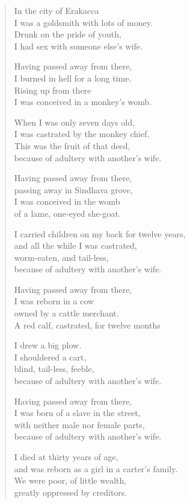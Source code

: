 \documentclass[12pt,openany]{book}%
\begin{document}
\begin{verse}
In the city of Erakacca \\
I was a goldsmith with lots of money. \\
Drunk on the pride of youth, \\
I had sex with someone else’s wife. 

Having passed away from there, \\
I burned in hell for a long time. \\
Rising up from there \\
I was conceived in a monkey’s womb. 

When I was only seven days old, \\
I was castrated by the monkey chief. \\
This was the fruit of that deed, \\
because of adultery with another’s wife. 

Having passed away from there, \\
passing away in Sindhava grove, \\
I was conceived in the womb \\
of a lame, one-eyed she-goat. 

I carried children on my back for twelve years, \\
and all the while I was castrated, \\
worm-eaten, and tail-less, \\
because of adultery with another’s wife. 

Having passed away from there, \\
I was reborn in a cow \\
owned by a cattle merchant. \\
A red calf, castrated, for twelve months 

I drew a big plow. \\
I shouldered a cart, \\
blind, tail-less, feeble, \\
because of adultery with another’s wife. 

Having passed away from there, \\
I was born of a slave in the street, \\
with neither male nor female parts, \\
because of adultery with another’s wife. 

I died at thirty years of age, \\
and was reborn as a girl in a carter’s family. \\
We were poor, of little wealth, \\
greatly oppressed by creditors. 


\end{verse}
\end{document}
